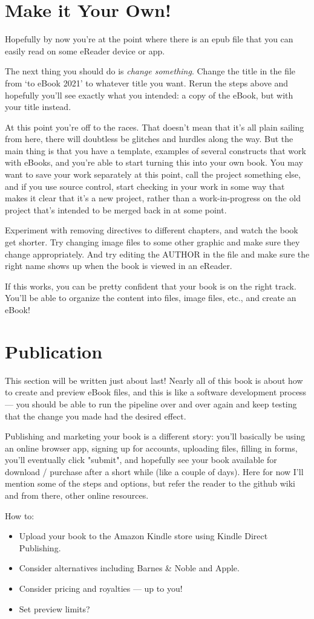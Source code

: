 \section{Make it Your Own!}

Hopefully by now you're at the point where there is an epub file that you can easily read on some eReader device or app. 

The next thing you should do is {\em change something}. Change the title in the  file from `\latex to eBook 2021'
to whatever title you want. Rerun the steps above and hopefully you'll see exactly what you intended: a copy of the eBook, but with
your title instead.

At this point you're off to the races. That doesn't mean that it's all plain sailing from here, there will doubtless be glitches and hurdles along the way.
But the main thing is that you have a template, examples of several \latex constructs that work with eBooks, and you're able to start turning this
into your own book. You may want to save your work separately at this point, call the project something else, and if you use source control,
start checking in your work in some way that makes it clear that it's a new project, rather than a work-in-progress on the old project that's intended to be
merged back in at some point.

Experiment with removing directives to  different chapters, and watch the book get shorter. Try changing image files to some other graphic
and make sure they change appropriately. And try editing the AUTHOR in the  file and make sure the right name shows up when the book is viewed in an eReader.

If this works, you can be pretty confident that your book is on the right track. You'll be able to organize the content into \tex files, image files, etc., and create an eBook!


\section{Publication}

This section will be written just about last! Nearly all of this book is about how to create and preview eBook files, and this is like a software development process
--- you should be able to run the pipeline over and over again and keep testing that the change you made had the desired effect.

Publishing and marketing your book is a different story: you'll basically be using an online browser app, signing up for accounts, uploading files, filling in forms,
you'll eventually click "submit", and hopefully see your book available for download / purchase after a short while (like a couple of days). Here for now
I'll mention some of the steps and options, but refer the reader to the github wiki and from there, other online resources.

How to:
\begin{itemize}
\item Upload your book to the Amazon Kindle store using Kindle Direct Publishing.
\item Consider alternatives including Barnes \& Noble and Apple.
\item Consider pricing and royalties --- up to you!
\item Set preview limits?
\end{itemize}





